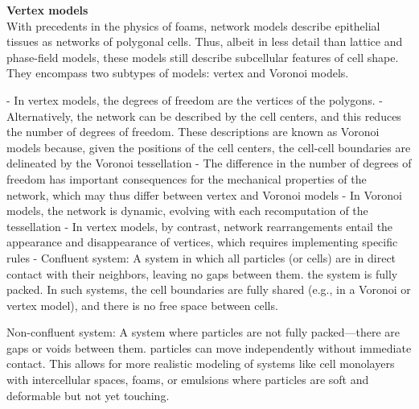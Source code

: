 \textbf{Vertex models} \\

With precedents in the physics of foams, network models describe epithelial tissues as networks of polygonal cells. Thus, albeit in less detail than lattice and phase-field models, these models still describe subcellular features of cell shape. They encompass two subtypes of models: vertex and Voronoi models.

- In vertex models, the degrees of freedom are the vertices of the polygons.
- Alternatively, the network can be described by the cell centers, and this reduces the number of degrees of freedom. These descriptions are known as Voronoi models because, given the positions of the cell centers, the cell-cell boundaries are delineated by the Voronoi tessellation
- The difference in the number of degrees of freedom has important consequences for the mechanical properties of the network, which may thus differ between vertex and Voronoi models 
- In Voronoi models, the network is dynamic, evolving with each recomputation of the tessellation
- In vertex models, by contrast, network rearrangements entail the appearance and disappearance of vertices, which requires implementing specific rules
- Confluent system: A system in which all particles (or cells) are in direct contact with their neighbors, leaving no gaps between them. the system is fully packed. In such systems, the cell boundaries are fully shared (e.g., in a Voronoi or vertex model), and there is no free space between cells.

Non-confluent system: A system where particles are not fully packed—there are gaps or voids between them. particles can move independently without immediate contact. This allows for more realistic modeling of systems like cell monolayers with intercellular spaces, foams, or emulsions where particles are soft and deformable but not yet touching.


